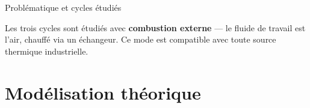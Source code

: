 \documentclass[aspectratio=43, 10pt]{beamer}
\begin{document}
\begin{frame}{Probl\'ematique et cycles \'etudi\'es}
  \vspace{0.7em}
  \begin{exampleblock}{}
    \small
    Les trois cycles sont \'etudi\'es avec \textbf{combustion externe} ---
    le fluide de travail est l'air, chauff\'e via un \'echangeur.
    Ce mode est compatible avec toute source thermique industrielle.
  \end{exampleblock}

\end{frame}

\section{Mod\'elisation th\'eorique}
\end{document}
